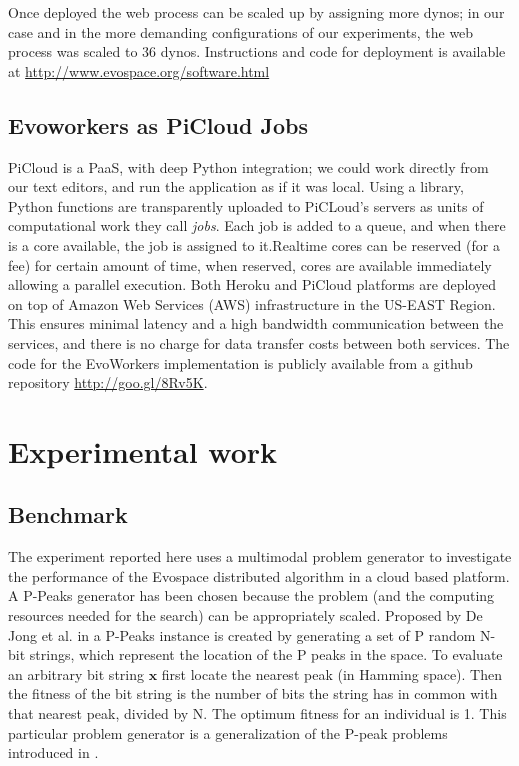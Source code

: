 \documentclass{llncs}
\begin{document}
Once deployed the web process can be scaled up by assigning more dynos; in our case and in the more demanding configurations of our experiments, the web process was scaled to 36 dynos. Instructions and code for deployment is available at \url{http://www.evospace.org/software.html}
\subsection{Evoworkers as PiCloud Jobs}
PiCloud is a PaaS, with deep Python integration; we could work directly from our text editors, and run the application as if it was local. Using a library, Python functions are transparently uploaded to PiCLoud's servers as units of computational work they call \emph{jobs}. Each job is added to a queue, and when there is a core available, the job is assigned to it.Realtime cores can be reserved (for a fee) for certain amount of time, when reserved, cores are available immediately allowing a parallel execution. Both Heroku and PiCloud platforms are deployed  on top of Amazon Web Services (AWS) infrastructure in the US-EAST Region. This ensures minimal latency and a high bandwidth communication between the services, and there is no charge for data transfer costs between both services. The code for the EvoWorkers implementation is publicly available from a github repository \url{http://goo.gl/8Rv5K}.

\section{Experimental work}
\subsection{Benchmark}
\label{ss:benchmark}
The experiment reported here uses a multimodal problem generator to
investigate the performance of the Evospace distributed algorithm in a
cloud based platform. A P-Peaks generator has been chosen because the problem
(and the computing resources needed for the search) can be appropriately scaled.
Proposed by De Jong et al. in \cite{Jong:PS97} a
P-Peaks instance is created by generating a set of P random N-bit
strings, which represent the location of the P peaks in the space. To
evaluate an arbitrary bit string \begin{math} \mathbf{x} \end{math}
first locate the nearest peak (in Hamming space). Then the fitness of
the bit string is the number of bits the string has in common with
that nearest peak, divided by N. The optimum fitness for an individual
is 1. This particular problem generator is a generalization of the
P-peak problems introduced in \cite{Jong:1990}.             %
\end{document}
